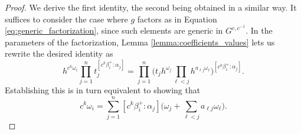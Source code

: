 \documentclass[12pt]{amsart}
\newcommand{\RR}{\mathbb{R}}
\theoremstyle{remark}
\numberwithin{equation}{section}
\begin{document}
\begin{proof}
  We derive the first identity, the second being obtained in a similar way. It suffices to consider the case where $g$ factors as in Equation \ref{eq:generic_factorization}, since such elements are generic in $G^{c,c^{-1}}$.  
  In the parameters of the factorization, Lemma \ref{lemma:coefficients_values} lets us rewrite the desired identity as
\[
h^{c^k\omega_i}\prod_{j=1}^n t_{j}^{[c^k\beta_i^+:\alpha_j]} = \prod_{j=1}^n\Big( 
    t_j
    h^{\omega_j}\prod_{ \ell <j}h^{a_{\ell j}\omega_ \ell }\Big)^{[c^k\beta_i^+:\alpha_j]}.
\]
Establishing this is in turn equivalent to showing that
  \begin{equation}\label{eq:coxeter_identity_omega}
    c^k\omega_i 
    =
    \sum_{j=1}^n
    [c^k\beta_i^+:\alpha_j]
    \Big(
    \omega_j+
    \sum_{\ell<j} a_{\ell j}\omega_\ell
    \Big).
  \end{equation}



\end{proof}
\end{document}
